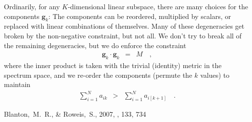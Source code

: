 \documentclass[preprint]{aastex}
\newcommand{\mmatrix}[1]{\boldsymbol{#1}}
\newcommand{\gvec}{\mmatrix{g}}
\begin{document}
Ordinarily, for any $K$-dimensional linear subspace, there are many
choices for the components $\gvec_k$: The components can be reordered,
multiplied by scalars, or replaced with linear combinations of
themselves.  Many of these degeneracies get broken by the non-negative
constraint, but not all.  We don't try to break all of the remaining
degeneracies, but we do enforce the constraint
\begin{eqnarray}\displaystyle
\gvec_k\cdot\gvec_k &=& M
\quad,
\end{eqnarray}
where the inner product is taken with the trivial (identity) metric in
the spectrum space, and we re-order the components (permute the $k$
values) to maintain
\begin{eqnarray}\displaystyle
\sum_{i=1}^N a_{ik} &>& \sum_{i=1}^N a_{i[k+1]}
\quad.
\end{eqnarray}

\begin{thebibliography}{70}
Blanton,~M.~R., \& Roweis,~S., 2007, \aj, 133, 734 
\end{thebibliography}
\end{document}
